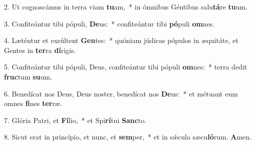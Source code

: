 2. Ut cognoscámus in terra viam \textbf{tu}am,~*  in ómnibus Géntibus salu\textbf{tá}re \textbf{tu}um.\

3. Confiteántur tibi pópuli, \textbf{De}us:~*  confiteántur tibi \textbf{pó}puli \textbf{om}nes.\

4. Læténtur et exsúltent \textbf{Gen}tes:~*  quóniam júdicas pópulos in æquitáte, et Gentes in \textbf{ter}ra \textbf{dí}rigis.\

5. Confiteántur tibi pópuli, Deus, confiteántur tibi pópuli \textbf{om}nes:~*  terra dedit \textbf{fruc}tum \textbf{su}um.\

6. Benedícat nos Deus, Deus noster, benedícat nos \textbf{De}us:~*  et métuant eum omnes \textbf{fi}nes \textbf{ter}ræ.\

7. Glória Patri, et \textbf{Fí}lio,~*  et Spi\textbf{rí}tui \textbf{Sanc}to.\

8. Sicut erat in princípio, et nunc, et \textbf{sem}per,~*  et in sǽcula sæcu\textbf{ló}rum. \textbf{A}men.\

